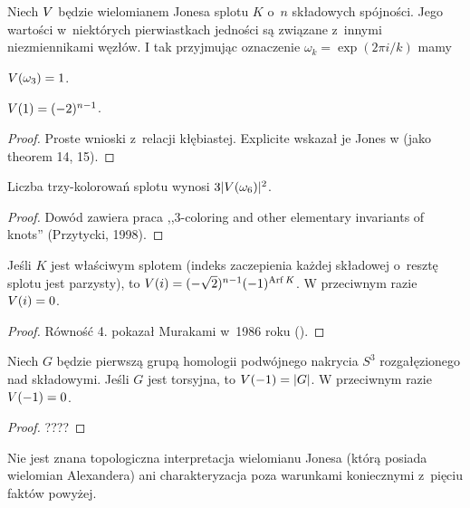 Niech $V$ będzie wielomianem Jonesa splotu $K$ o~$n$ składowych spójności.
Jego wartości w~niektórych pierwiastkach jedności są związane z~innymi niezmiennikami węzłów.
I tak przyjmując oznaczenie $\omega_k = \exp(2\pi i/k)$ mamy

\begin{proposition} \label{jones_sharp_p_hard}
    $V(\omega_3) = 1$.
\end{proposition}

\begin{proposition}
    $V(1) = (-2)^{n-1}$.
\end{proposition}

\begin{proof}
    Proste wnioski z~relacji kłębiastej.
    Explicite wskazał je Jones w \cite{jones85} (jako theorem 14, 15).
\end{proof}

\begin{proposition}
    Liczba trzy-kolorowań splotu wynosi $3|V(\omega_6)|^2$.
\end{proposition}

\begin{proof}
    Dowód zawiera praca ,,3-coloring and other elementary invariants of knots'' (Przytycki, 1998).
\end{proof}

\begin{proposition}
    Jeśli $K$ jest właściwym splotem (indeks zaczepienia każdej składowej o~resztę splotu jest parzysty), to $V(i) = (-\sqrt 2)^{n-1}(-1)^{\operatorname{Arf} K}$.
    W przeciwnym razie $V(i) = 0$.
\end{proposition}

\begin{proof}
    Równość 4. pokazał Murakami w~1986 roku (\cite{murakami86}).
\end{proof}

\begin{proposition}
    Niech $G$ będzie pierwszą grupą homologii podwójnego nakrycia $S^3$ rozgałęzionego nad składowymi.
    Jeśli $G$ jest torsyjna, to $V(-1) = |G|$.
    W przeciwnym razie $V(-1) = 0$.
\end{proposition}

\begin{proof}
    ????
\end{proof}

Nie jest znana topologiczna interpretacja wielomianu Jonesa (którą posiada wielomian Alexandera) ani charakteryzacja poza warunkami koniecznymi z~pięciu faktów powyżej.

